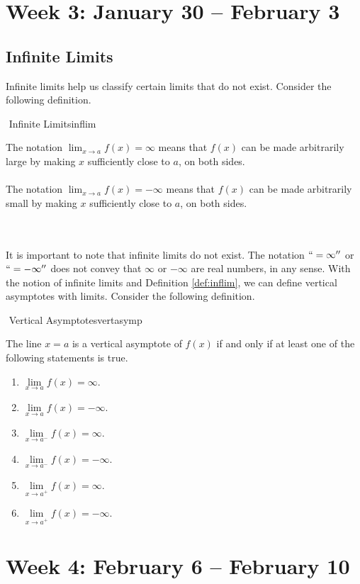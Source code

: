 \pagebreak

\section{Week 3: January 30 -- February 3}

    \subsection{Infinite Limits}

        Infinite limits help us classify certain limits that do not exist. Consider the following definition.
        \begin{definition}{\Stop\,\,Infinite Limits}{inflim}

            The notation \(\lim_{x\to a}f(x)=\infty\) means that \(f(x)\) can be made arbitrarily large by making \(x\) sufficiently close to \(a\), on both sides.
            \\
            \\
            The notation \(\lim_{x\to a}f(x)=-\infty\) means that \(f(x)\) can be made arbitrarily small by making \(x\) sufficiently close to \(a\), on both sides.

        \end{definition}
        \vphantom
        \\
        \\
        It is important to note that infinite limits do not exist. The notation \(``=\infty''\) or \(``=-\infty''\) does not convey that \(\infty\) or \(-\infty\) are real numbers, in any sense. With the notion of infinite limits and Definition \ref{def:inflim}, we can define vertical asymptotes with limits. Consider the following definition.
        \begin{definition}{\Stop\,\,Vertical Asymptotes}{vertasymp}
            
            The line \(x=a\) is a vertical asymptote of \(f(x)\) if and only if at least one of the following statements is true.
            \begin{enumerate}
                \item \(\lim\limits_{x\to a}f(x)=\infty\).
                \item \(\lim\limits_{x\to a}f(x)=-\infty\).
                \item \(\lim\limits_{x\to a^-}f(x)=\infty\).
                \item \(\lim\limits_{x\to a^-}f(x)=-\infty\).
                \item \(\lim\limits_{x\to a^+}f(x)=\infty\).
                \item \(\lim\limits_{x\to a^+}f(x)=-\infty\).
            \end{enumerate}

        \end{definition}

\section{Week 4: February 6 -- February 10}